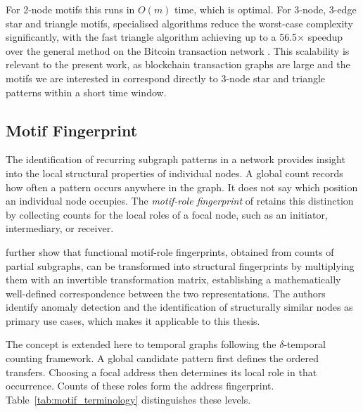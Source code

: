 \documentclass{thesisclass}
\begin{document}
For 2-node motifs this runs in 
$O(m)$ time, which is optimal. For 3-node, 3-edge star and triangle motifs, specialised algorithms reduce the worst-case complexity significantly, with the fast triangle algorithm achieving up to a 56.5$\times$ speedup over the general method on the Bitcoin transaction network \citep{paranjape2017motifs}. This scalability is relevant to the present work, as blockchain transaction graphs are large and the motifs we are interested in correspond directly to 3-node star and triangle patterns within a short time window.

\subsection{Motif Fingerprint}
The identification of recurring subgraph patterns in a network provides insight
into the local structural properties of individual nodes. A global count records
how often a pattern occurs anywhere in the graph. It does not say which position
an individual node occupies. The \emph{motif-role fingerprint} of
\citet{McDonnell2014} retains this distinction by collecting counts for the local
roles of a focal node, such as an initiator, intermediary, or receiver.

\citet{McDonnell2014} further show that functional motif-role fingerprints, obtained from counts of partial subgraphs, can be transformed into structural fingerprints by multiplying them with an invertible transformation matrix, establishing a mathematically well-defined correspondence between the two representations. The authors identify anomaly detection and the identification of structurally similar nodes as primary use cases, which makes it applicable to this thesis.

The concept is extended here to temporal graphs following the
$\delta$-temporal counting framework. A global candidate pattern first defines
the ordered transfers. Choosing a focal address then determines its local role
in that occurrence. Counts of these roles form the address fingerprint.
Table~\ref{tab:motif_terminology} distinguishes these levels.
\end{document}
